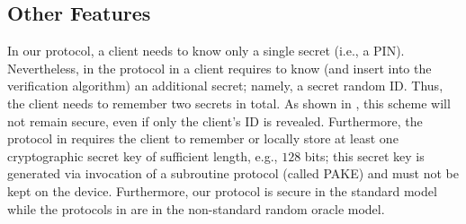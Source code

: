 \vspace{-2mm}
\subsection{Other Features}

 In our protocol, a client needs to know only a single secret (i.e., a  PIN). Nevertheless, in the protocol in \cite{WangW18} a client requires to know (and insert into the verification algorithm) an additional secret; namely, a secret random ID. Thus, the client needs to remember two secrets in total.  As shown in \cite{Scott12a}, this scheme will not remain secure, even if only the client's ID is revealed. Furthermore, the protocol in \cite{JareckiJKSS21} requires the client to remember or locally store at least one cryptographic secret key of sufficient length, e.g., $128$ bits; this secret key is generated via invocation of a subroutine protocol (called PAKE) and must not be kept on the device. 
 Furthermore, our protocol is secure in the standard model while the protocols in \cite{WangW18,JareckiJKSS21} are in the non-standard random oracle model. 

